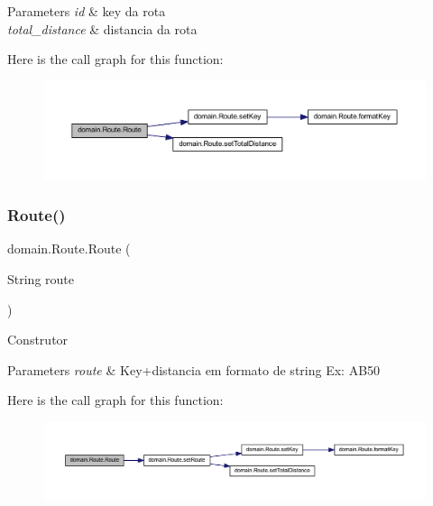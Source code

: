 \begin{DoxyParams}{Parameters}
{\em id} & key da rota \\
\hline
{\em total\+\_\+distance} & distancia da rota \\
\hline
\end{DoxyParams}
Here is the call graph for this function\+:\nopagebreak
\begin{figure}[H]
\begin{center}
\leavevmode
\includegraphics[width=350pt]{classdomain_1_1_route_a18a40dd809d38f62057c29212b3e2e76_cgraph}
\end{center}
\end{figure}
\mbox{\label{classdomain_1_1_route_a22e34515792c628b7a3953744054d5fe}} 
\subsubsection{\texorpdfstring{Route()}{Route()}\hspace{0.1cm}{\footnotesize\ttfamily [3/3]}}
{\footnotesize\ttfamily domain.\+Route.\+Route (\begin{DoxyParamCaption}\item[{String}]{route }\end{DoxyParamCaption})}

Construtor


\begin{DoxyParams}{Parameters}
{\em route} & Key+distancia em formato de string Ex\+: A\+B50 \\
\hline
\end{DoxyParams}
Here is the call graph for this function\+:\nopagebreak
\begin{figure}[H]
\begin{center}
\leavevmode
\includegraphics[width=350pt]{classdomain_1_1_route_a22e34515792c628b7a3953744054d5fe_cgraph}
\end{center}
\end{figure}


